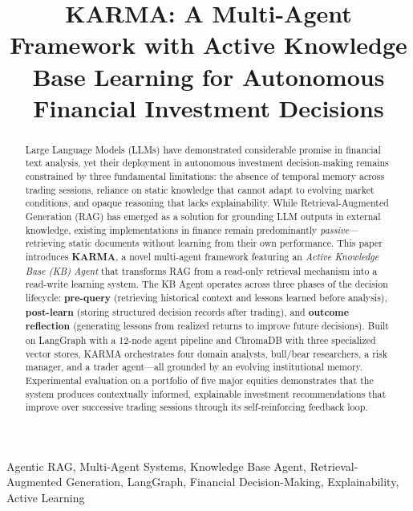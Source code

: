 \documentclass[conference]{IEEEtran}
\begin{document}
\title{KARMA: A Multi-Agent Framework with Active Knowledge Base Learning for Autonomous Financial Investment Decisions}

\author{
}

\maketitle

\begin{abstract}
Large Language Models (LLMs) have demonstrated considerable promise in financial text analysis, yet their deployment in autonomous investment decision-making remains constrained by three fundamental limitations: the absence of temporal memory across trading sessions, reliance on static knowledge that cannot adapt to evolving market conditions, and opaque reasoning that lacks explainability. While Retrieval-Augmented Generation (RAG) has emerged as a solution for grounding LLM outputs in external knowledge, existing implementations in finance remain predominantly \textit{passive}---retrieving static documents without learning from their own performance. This paper introduces \textbf{KARMA}, a novel multi-agent framework featuring an \textit{Active Knowledge Base (KB) Agent} that transforms RAG from a read-only retrieval mechanism into a read-write learning system. The KB Agent operates across three phases of the decision lifecycle: \textbf{pre-query} (retrieving historical context and lessons learned before analysis), \textbf{post-learn} (storing structured decision records after trading), and \textbf{outcome reflection} (generating lessons from realized returns to improve future decisions). Built on LangGraph with a 12-node agent pipeline and ChromaDB with three specialized vector stores, KARMA orchestrates four domain analysts, bull/bear researchers, a risk manager, and a trader agent---all grounded by an evolving institutional memory. Experimental evaluation on a portfolio of five major equities demonstrates that the system produces contextually informed, explainable investment recommendations that improve over successive trading sessions through its self-reinforcing feedback loop.
\end{abstract}

\begin{IEEEkeywords}
Agentic RAG, Multi-Agent Systems, Knowledge Base Agent, Retrieval-Augmented Generation, LangGraph, Financial Decision-Making, Explainability, Active Learning
\end{IEEEkeywords}
\end{document}
